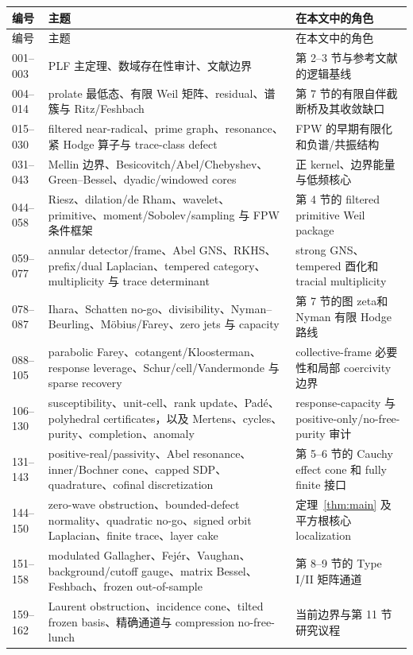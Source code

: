 \documentclass[UTF8,11pt,a4paper]{ctexart}
\theoremstyle{definition}
\theoremstyle{remark}
\newcommand{\1}{\mathbf 1}
\begin{document}
\begingroup\small
\begin{longtable}{@{}p{}p{}p{}@{}}
\toprule
编号 & 主题 & 在本文中的角色\\
\midrule
\endfirsthead
\toprule
编号 & 主题 & 在本文中的角色\\
\midrule
\endhead
001--003 & PLF 主定理、数域存在性审计、文献边界 & 第 2--3 节与参考文献的逻辑基线\\
004--014 & prolate 最低态、有限 Weil 矩阵、residual、谱簇与 Ritz/Feshbach & 第 7 节的有限自伴截断桥及其收敛缺口\\
015--030 & filtered near-radical、prime graph、resonance、紧 Hodge 算子与 trace-class defect & FPW 的早期有限化和负谱/共振结构\\
031--043 & Mellin 边界、Besicovitch/Abel/Chebyshev、Green--Bessel、dyadic/windowed cores & 正 kernel、边界能量与低频核心\\
044--058 & Riesz、dilation/de Rham、wavelet、primitive、moment/Sobolev/sampling 与 FPW 条件框架 & 第 4 节的 filtered primitive Weil package\\
059--077 & annular detector/frame、Abel GNS、RKHS、prefix/dual Laplacian、tempered category、multiplicity 与 trace determinant & strong GNS、tempered 酉化和 tracial multiplicity\\
078--087 & Ihara、Schatten no-go、divisibility、Nyman--Beurling、M\"obius/Farey、zero jets 与 capacity & 第 7 节的图 zeta和 Nyman 有限 Hodge 路线\\
088--105 & parabolic Farey、cotangent/Kloosterman、response leverage、Schur/cell/Vandermonde 与 sparse recovery & collective-frame 必要性和局部 coercivity 边界\\
106--130 & susceptibility、unit-cell、rank update、Pad\'e、polyhedral certificates，以及 Mertens、cycles、purity、completion、anomaly & response-capacity 与 positive-only/no-free-purity 审计\\
131--143 & positive-real/passivity、Abel resonance、inner/Bochner cone、capped SDP、quadrature、cofinal discretization & 第 5--6 节的 Cauchy effect cone 和 fully finite 接口\\
144--150 & zero-wave obstruction、bounded-defect normality、quadratic no-go、signed orbit Laplacian、finite trace、layer cake & 定理~\ref{thm:main} 及平方根核心 localization\\
151--158 & modulated Gallagher、Fej\'er、Vaughan、background/cutoff gauge、matrix Bessel、Feshbach、frozen out-of-sample & 第 8--9 节的 Type I/II 矩阵通道\\
159--162 & Laurent obstruction、incidence cone、tilted frozen basis、精确通道与 compression no-free-lunch & 当前边界与第 11 节研究议程\\

\end{longtable}
\end{document}
